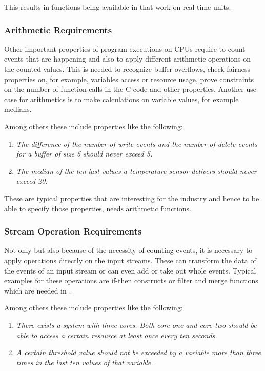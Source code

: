 This results in functions being available in \tessla that work on real time units.

\subsubsection{Arithmetic Requirements}

Other important properties of program executions on CPUs require to count events that are happening and also to apply different arithmetic operations on the counted values. This is needed to recognize buffer overflows, check fairness properties on, for example, variables access or resource usage, prove constraints on the number of function calls in the C code and other properties. Another use case for arithmetics is to make calculations on variable values, for example medians.

Among others these include properties like the following:

\begin{enumerate}
	\item \textit{The difference of the number of write events and the number of delete events for a buffer of size 5 should never exceed 5.}
	\item \textit{The median of the ten last values a temperature sensor delivers should never exceed 20.}
\end{enumerate}

These are typical properties that are interesting for the industry and hence to be able to specify those properties, \tessla needs arithmetic functions.

\subsubsection{Stream Operation Requirements}

Not only but also because of the necessity of counting events, it is necessary to apply operations directly on the input streams. These can transform the data of the events of an input stream or can even add or take out whole events. Typical examples for these operations are if-then constructs or filter and merge functions which are needed in \tessla.

Among others these include properties like the following:

\begin{enumerate}
	\item \textit{There exists a system with three cores. Both core one and core two should be able to access a certain resource at least once every ten seconds.}
	\item \textit{A certain threshold value should not be exceeded by a variable more than three times in the last ten values of that variable.}
\end{enumerate}

